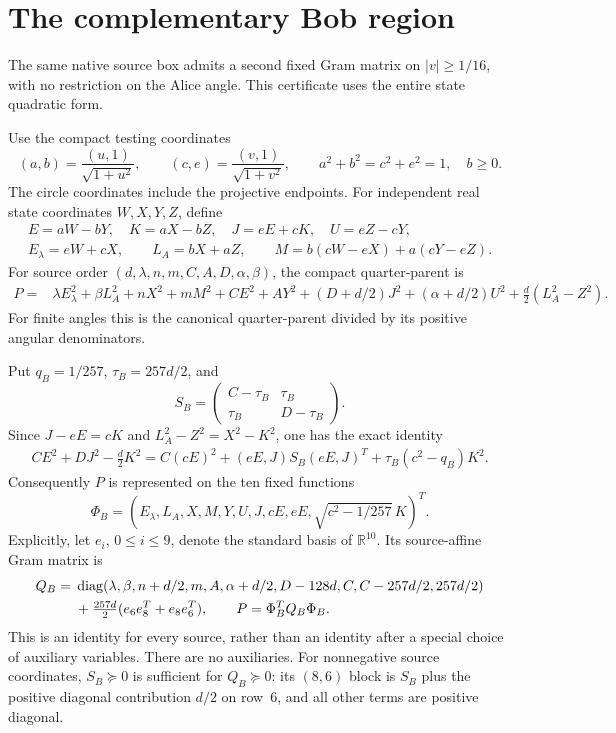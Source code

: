 \section{The complementary Bob region}\label{sec:R1-Bob-complement}
The same native source box admits a second fixed Gram matrix on
$|v|\geq1/16$, with no restriction on the Alice angle. This certificate
uses the entire state quadratic form.

Use the compact testing coordinates
\[
 (a,b)=\frac{(u,1)}{\sqrt{1+u^2}},\qquad
 (c,e)=\frac{(v,1)}{\sqrt{1+v^2}},\qquad
 a^2+b^2=c^2+e^2=1,\quad b\geq0.
\]
The circle coordinates include the projective endpoints. For independent
real state coordinates $W,X,Y,Z$, define
\begin{gather*}
 E=aW-bY,\quad K=aX-bZ,\quad J=eE+cK,\quad U=eZ-cY,\\
 E_\lambda=eW+cX,\qquad L_A=bX+aZ,\qquad
 M=b(cW-eX)+a(cY-eZ).
\end{gather*}
For source order $(d,\lambda,n,m,C,A,D,\alpha,\beta)$, the compact
quarter-parent is
\begin{align}
 P={}&\lambda E_\lambda^2+\beta L_A^2+nX^2+mM^2+CE^2+AY^2
 +(D+d/2)J^2+(\alpha+d/2)U^2
       +\tfrac d2(L_A^2-Z^2).
 \label{eq:R1-Bob-parent}
\end{align}
For finite angles this is the canonical quarter-parent divided by its
positive angular denominators.

Put $q_B=1/257$, $\tau_B=257d/2$, and
\[
 S_B=\begin{pmatrix}C-\tau_B&\tau_B\\
                     \tau_B&D-\tau_B\end{pmatrix}.
\]
Since $J-eE=cK$ and $L_A^2-Z^2=X^2-K^2$, one has the exact identity
\begin{align}
 CE^2+DJ^2-\tfrac d2K^2
 =C(cE)^2+(eE,J)S_B(eE,J)^T
           +\tau_B(c^2-q_B)K^2.\label{eq:R1-Bob-allocation}
\end{align}
Consequently $P$ is represented on the ten fixed functions
\begin{equation}
 \Phi_B=(E_\lambda,L_A,X,M,Y,U,J,cE,eE,
                          \sqrt{c^2-1/257}\,K)^T.
 \label{eq:R1-Bob-functions}
\end{equation}
Explicitly, let $e_i$, $0\leq i\leq9$, denote the standard basis of
$\mathbb R^{10}$. Its source-affine Gram matrix is
\begin{align}
 Q_B={}&\operatorname{diag}(\lambda,\beta,n+d/2,m,A,\alpha+d/2,
                   D-128d,C,C-257d/2,257d/2)\notag\\
       &+\tfrac{257d}{2}(e_6e_8^T+e_8e_6^T),\qquad
                 P=\Phi_B^TQ_B\Phi_B .
 \label{eq:R1-Bob-matrix}
\end{align}
This is an identity for every source, rather than an identity after a
special choice of auxiliary variables. There are no auxiliaries.
For nonnegative source coordinates, $S_B\succeq0$ is sufficient for
$Q_B\succeq0$: its $(8,6)$ block is $S_B$ plus the positive diagonal
contribution $d/2$ on row~6, and all other terms are positive diagonal.

